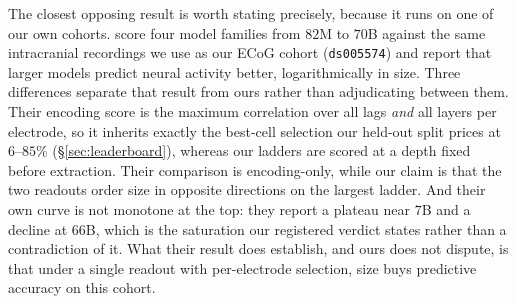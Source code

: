 \documentclass{article}
\begin{document}
The closest opposing result is worth stating precisely, because it runs on one of our own
cohorts. \citet{hong2026larger} score four model families from $82$M to $70$B against the same
intracranial recordings we use as our ECoG cohort (\texttt{ds005574}) and report that larger
models predict neural activity better, logarithmically in size. Three differences separate that
result from ours rather than adjudicating between them. Their encoding score is the maximum
correlation over all lags \emph{and} all layers per electrode, so it inherits exactly the
best-cell selection our held-out split prices at $6$--$85\%$ (\S\ref{sec:leaderboard}), whereas
our ladders are scored at a depth fixed before extraction. Their comparison is encoding-only,
while our claim is that the two readouts order size in opposite directions on the largest ladder.
And their own curve is not monotone at the top: they report a plateau near $7$B and a decline at
$66$B, which is the saturation our registered verdict states rather than a contradiction of it.
What their result does establish, and ours does not dispute, is that under a single readout with
per-electrode selection, size buys predictive accuracy on this cohort.
\end{document}
